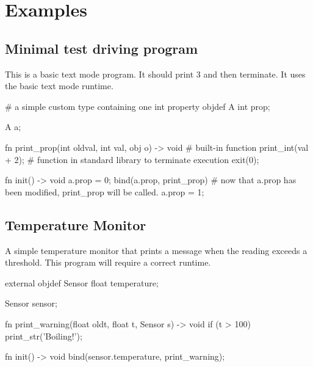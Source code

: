 \section{Examples}
\subsection{Minimal test driving program}
This is a basic text mode program. It should print 3 and then terminate.
It uses the basic text mode runtime.

\vspace{-0.5cm}
\begin{mylisting}
# a simple custom type containing one int property
objdef A
{
  int prop;
}

A a;

fn print_prop(int oldval, int val, obj o) -> void
{
  # built-in function
  print_int(val + 2);
  # function in standard library to terminate execution
  exit(0);
}

fn init() -> void
{
  a.prop = 0;
  bind(a.prop, print_prop)
  # now that a.prop has been modified, print_prop will be called.
  a.prop = 1;
}
\end{mylisting}

\subsection{Temperature Monitor}
A simple temperature monitor that prints a message when the reading exceeds a threshold.
This program will require a correct runtime.

\vspace{-0.5cm}
\begin{mylisting}
external objdef Sensor
{
  float temperature;
}

Sensor sensor;

fn print_warning(float oldt, float t, Sensor s) -> void
{
  if (t > 100)
  {
    print_str('Boiling!');
  }
}

fn init() -> void
{
  bind(sensor.temperature, print_warning);
}
\end{mylisting}
